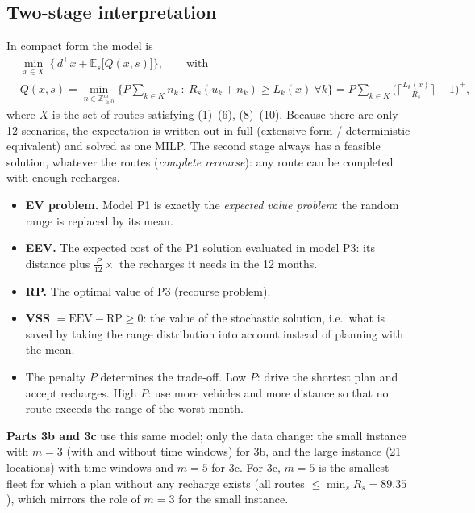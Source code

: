 \documentclass[11pt,a4paper]{article}
\theoremstyle{definition}
\newcommand{\Z}{\mathbb{Z}}
\newcommand{\sumk}{\sum_{k\in K}}
\begin{document}
\subsection{Two-stage interpretation}
In compact form the model is
\begin{align*}
&\min_{x\in X}\ \Big\{\,d^\top x+\mathbb E_s\big[Q(x,s)\big]\Big\},\qquad\text{with}\\
&Q(x,s)=\min_{n\in\Z^{m}_{\ge0}}\Big\{P\sumk n_{k}\ :\ R_s(u_k+n_k)\ge L_k(x)\ \forall k\Big\}=P\sumk\Big(\Big\lceil\tfrac{L_k(x)}{R_s}\Big\rceil-1\Big)^{+},
\end{align*}
where $X$ is the set of routes satisfying (1)--(6), (8)--(10). Because there are only 12 scenarios, the expectation is written out in full (extensive form / deterministic equivalent) and solved as one MILP. The second stage always has a feasible solution, whatever the routes (\emph{complete recourse}): any route can be completed with enough recharges.

\begin{notebox}
\begin{itemize}
\item \textbf{EV problem.} Model P1 is exactly the \emph{expected value problem}: the random range is replaced by its mean.
\item \textbf{EEV.} The expected cost of the P1 solution evaluated in model P3: its distance plus $\frac{P}{12}\times$ the recharges it needs in the 12 months.
\item \textbf{RP.} The optimal value of P3 (recourse problem).
\item \textbf{VSS} $=\text{EEV}-\text{RP}\ge0$: the value of the stochastic solution, i.e.\ what is saved by taking the range distribution into account instead of planning with the mean.
\item The penalty $P$ determines the trade-off. Low $P$: drive the shortest plan and accept recharges. High $P$: use more vehicles and more distance so that no route exceeds the range of the worst month.
\end{itemize}
\end{notebox}

\textbf{Parts 3b and 3c} use this same model; only the data change: the small instance with $m=3$ (with and without time windows) for 3b, and the large instance (21 locations) with time windows and $m=5$ for 3c. For 3c, $m=5$ is the smallest fleet for which a plan without any recharge exists (all routes $\le\min_sR_s=89.35$), which mirrors the role of $m=3$ for the small instance.
\end{document}
